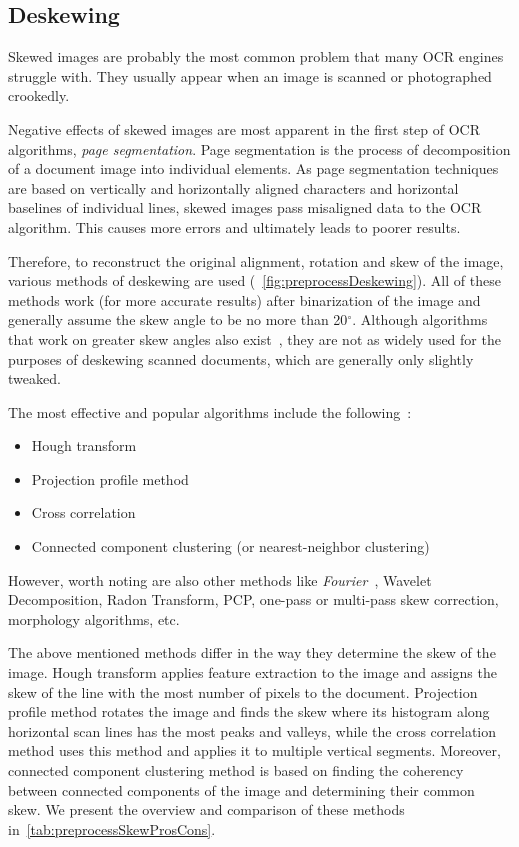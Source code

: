\subsection{Deskewing} \label{deskewing}

Skewed images are probably the most common problem that many OCR engines struggle with. They usually appear when an image is scanned or photographed crookedly.

Negative effects of skewed images are most apparent in the first step of OCR algorithms, \emph{page segmentation}. Page segmentation is the process of decomposition of a document image into individual elements. As page segmentation techniques are based on vertically and horizontally aligned characters and horizontal baselines of individual lines, skewed images pass misaligned data to the OCR algorithm. This causes more errors and ultimately leads to poorer results.

Therefore, to reconstruct the original alignment, rotation and skew of the image, various methods of deskewing are used (~\cref{fig:preprocessDeskewing}). All of these methods work (for more accurate results) after binarization of the image and generally assume the skew angle to be no more than 20$^{\circ}$. Although algorithms that work on greater skew angles also exist~\citep{skewAngleDetection}, they are not as widely used for the purposes of deskewing scanned documents, which are generally only slightly tweaked.

The most effective and popular algorithms include the following~\citep{skewBestTechniques}:
\begin{itemize}
    \item Hough transform
    \item Projection profile method
    \item Cross correlation
    \item Connected component clustering (or nearest-neighbor clustering)
\end{itemize}
However, worth noting are also other methods like \emph{Fourier}~\citep{fourierTransform}, Wavelet Decomposition, Radon Transform, PCP, one-pass or multi-pass skew correction, morphology algorithms, etc.

The above mentioned methods differ in the way they determine the skew of the image. Hough transform applies feature extraction to the image and assigns the skew of the line with the most number of pixels to the document. Projection profile method rotates the image and finds the skew where its histogram along horizontal scan lines has the most peaks and valleys, while the cross correlation method uses this method and applies it to multiple vertical segments. Moreover, connected component clustering method is based on finding the coherency between connected components of the image and determining their common skew. We present the overview and comparison of these methods in~\cref{tab:preprocessSkewProsCons}.

